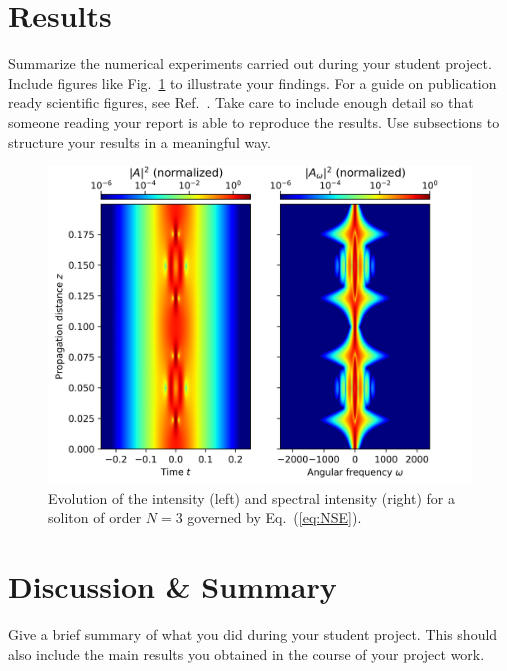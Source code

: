 \section{Results}

Summarize the numerical experiments carried out during your student project.
Include figures like Fig.~\ref{fig:fig01} to illustrate your findings.  For a
guide on publication ready scientific figures, see
Ref.~\cite{Rougier:PLOS:2014}.  Take care to include enough detail so that
someone reading your report is able to reproduce the results.  Use subsections
to structure your results in a meaningful way.

\begin{figure}[b!]
\centering
\includegraphics[width=\linewidth]{./figure01.png}
\caption{
Evolution of the intensity (left) and spectral intensity (right) for a 
soliton of order $N=3$ governed by Eq.~(\ref{eq:NSE}).}
\label{fig:fig01}
\end{figure}


\section{Discussion \& Summary}

Give a brief summary of what you did during your student project. This should
also include the main results you obtained in the course of your project work.

